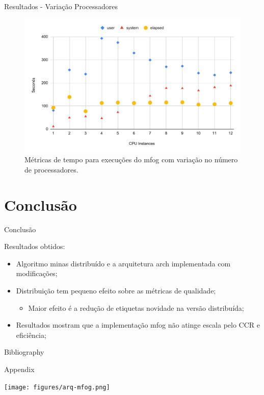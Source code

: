 \documentclass[aspectratio=1610,10pt]{beamer}
\begin{document}
\begin{frame}[fragile]{Resultados - Variação Processadores}
  \begin{figure}
    \centering
    \includegraphics[width=0.7\linewidth,page=1]{experiments/speedup-clean.pdf}
    \caption{Métricas de tempo para execuções do mfog com variação no número de processadores.}
    \label{fig:speedup}
  \end{figure}
\end{frame}

\section{Conclusão}
\begin{frame}{Conclusão}
  
  \begin{alertblock}{Resultados obtidos:}
  \begin{itemize}%
    \item Algoritmo minas distribuído e a arquitetura arch
    implementada com modificações;
    \item Distribuição tem pequeno efeito sobre as métricas de qualidade;
    \begin{itemize}
      \item Maior efeito é a redução de etiquetas novidade na versão distribuída;
    \end{itemize}
    \item Resultados mostram que a implementação mfog não atinge escala pelo CCR e eficiência;
  \end{itemize}
  \end{alertblock}
\end{frame}

\begin{frame}[allowframebreaks]{Bibliography}
  
  
\end{frame}

\appendix
{\begin{frame}[standout]
  Appendix
\end{frame}}
\begin{frame}\centering
  \texttt{[image: figures/arq-mfog.png]}
\end{frame}
\end{document}
